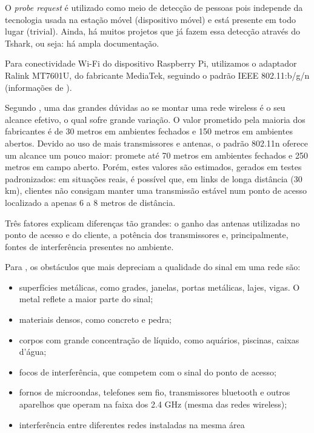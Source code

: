 O \emph{probe request} é utilizado como meio de detecção de pessoas pois
independe da tecnologia usada na estação móvel (dispositivo móvel) e está presente em todo lugar (trivial). Ainda, há muitos projetos que já fazem essa detecção através do Tshark, ou seja: há ampla documentação.

Para conectividade Wi-Fi do dispositivo Raspberry Pi, utilizamos o adaptador Ralink MT7601U, do fabricante MediaTek, seguindo o padrão IEEE 802.11:b/g/n (informações de ).

Segundo , uma das grandes dúvidas ao se montar uma rede wireless é o seu alcance efetivo, o qual sofre grande variação. O valor prometido pela maioria dos fabricantes é de 30 metros em ambientes fechados e 150 metros em ambientes abertos. Devido ao uso de mais transmissores e antenas, o padrão 802.11n oferece um alcance um pouco maior: promete até 70 metros em ambientes fechados e 250 metros em campo aberto. Porém, estes valores são estimados, gerados em testes padronizados: em situações reais, é possível que, em links de longa distância (30 km), clientes não consigam manter uma transmissão estável num ponto de acesso localizado a apenas 6 a 8 metros de distância.

Três fatores explicam diferenças tão grandes: o ganho das antenas utilizadas no ponto de acesso e do cliente, a potência dos transmissores e, principalmente, fontes de interferência presentes no ambiente.

Para , os obstáculos que mais depreciam a qualidade do sinal em uma rede são:

\begin{itemize}
  \item superfícies metálicas, como grades, janelas, portas metálicas, lajes, vigas. O metal reflete a maior parte do sinal;
  \item materiais densos, como concreto e pedra;
  \item corpos com grande concentração de líquido, como aquários, piscinas, caixas d'água;
	\item focos de interferência, que competem com o sinal do ponto de acesso;
	\item fornos de microondas, telefones sem fio, transmissores bluetooth e outros aparelhos que operam na faixa dos 2.4 GHz (mesma das redes wireless);
  \item interferência entre diferentes redes instaladas na mesma área
\end{itemize}

